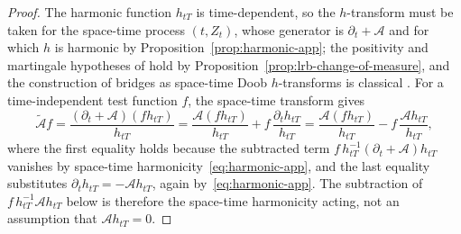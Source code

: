 \documentclass{article}
\theoremstyle{definition}
\begin{document}
\begin{proof}
The harmonic function $h_{tT}$ is time-dependent, so the $h$-transform must be taken for the space-time process $(t, Z_t)$, whose generator is $\partial_t + \mathcal{A}$ and for which $h$ is harmonic by Proposition~\ref{prop:harmonic-app}; the positivity and martingale hypotheses of \cite[Theorem~4.2]{PalmowskiRolski2002} hold by Proposition~\ref{prop:lrb-change-of-measure}, and the construction of bridges as space-time Doob $h$-transforms is classical \cite{FitzsimmonsPitmanYor1993}. For a time-independent test function $f$, the space-time transform gives
    \begin{equation}\label{eq:doob-h-formula}
      \widetilde{\mathcal{A}}f
      = \frac{(\partial_t + \mathcal{A})(f h_{tT})}{h_{tT}}
      = \frac{\mathcal{A}(f h_{tT})}{h_{tT}} + f\,\frac{\partial_t h_{tT}}{h_{tT}}
      = \frac{\mathcal{A}(f h_{tT})}{h_{tT}} - f\,\frac{\mathcal{A} h_{tT}}{h_{tT}},
    \end{equation}
    where the first equality holds because the subtracted term $f\,h_{tT}^{-1}(\partial_t + \mathcal{A})h_{tT}$ vanishes by space-time harmonicity~\eqref{eq:harmonic-app}, and the last equality substitutes $\partial_t h_{tT} = -\mathcal{A}h_{tT}$, again by~\eqref{eq:harmonic-app}. The subtraction of $f\,h_{tT}^{-1}\mathcal{A}h_{tT}$ below is therefore the space-time harmonicity acting, not an assumption that $\mathcal{A}h_{tT} = 0$.


\end{proof}
\end{document}
